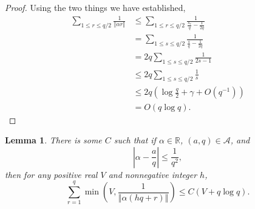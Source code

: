 \documentclass{article}
\newcommand{\norm}[1]{\left\Vert #1 \right\Vert}
\newtheorem{lemma}[theorem]{Lemma}
\begin{document}
\begin{proof}
Using the two things we have established, 
\begin{align*}
\sum_{1 \leq r \leq q/2} \frac{1}{\norm{\alpha r}}&\leq \sum_{1 \leq r \leq q/2} \frac{1}{\frac{s_r}{q}-\frac{1}{2q}}\\
&=\sum_{1 \leq s \leq q/2} \frac{1}{\frac{s}{q}-\frac{1}{2q}}\\
&= 2q \sum_{1 \leq s \leq q/2}  \frac{1}{2s-1}\\
&\leq 2q \sum_{1 \leq s \leq q/2} \frac{1}{s}\\
&\leq 2q \left( \log \frac{q}{2} + \gamma + O(q^{-1}) \right)\\
&=O(q \log q).
\end{align*}
\end{proof}



\begin{lemma}
There is some $C$ such that if $\alpha \in \mathbb{R}$, $(a,q) \in \mathscr{A}$, and
\[
\left|\alpha - \frac{a}{q} \right| \leq \frac{1}{q^2},
\]
then for any positive real $V$ and nonnegative integer $h$,
\[
\sum_{r=1}^q \min\left(V,\frac{1}{\norm{\alpha(hq+r)}}\right) \leq C(V+q\log q).
\]
\label{lemma49}
\end{lemma}
\end{document}

